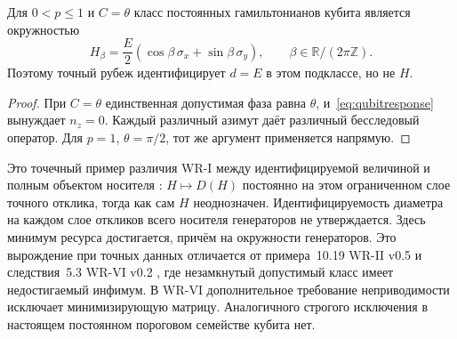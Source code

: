 \begin{corollary}\label{cor:circle}
{Для $0<p\leq1$ и $C=\theta$ класс постоянных гамильтонианов кубита является окружностью}
\begin{equation}\label{eq:circle}
 H_\beta=\frac E2(\cos\beta\,\sigma_x+\sin\beta\,\sigma_y),
 \qquad \beta\in\mathbb R/(2\pi\mathbb Z).
\end{equation}
{Поэтому точный рубеж идентифицирует $d=E$ в этом подклассе, но не $H$.}
\end{corollary}
\begin{proof}
{При $C=\theta$ единственная допустимая фаза равна $\theta$, и~\eqref{eq:qubitresponse} вынуждает $n_z=0$. Каждый различный азимут даёт различный бесследовый оператор. Для $p=1$, $\theta=\pi/2$, тот же аргумент применяется напрямую.}
\end{proof}
{Это точечный пример различия WR-I между идентифицируемой величиной и полным объектом носителя \cite{WRI}: $H\mapsto D(H)$ постоянно на этом ограниченном слое точного отклика, тогда как сам $H$ неоднозначен. Идентифицируемость диаметра на каждом слое откликов всего носителя генераторов не утверждается.}
{Здесь минимум ресурса достигается, причём на окружности генераторов. Это вырождение при точных данных отличается от примера~10.19 WR-II v0.5 \cite{WRII} и следствия~5.3 WR-VI v0.2 \cite{WRVI}, где незамкнутый допустимый класс имеет недостигаемый инфимум. В WR-VI дополнительное требование неприводимости исключает минимизирующую матрицу. Аналогичного строгого исключения в настоящем постоянном пороговом семействе кубита нет.}

